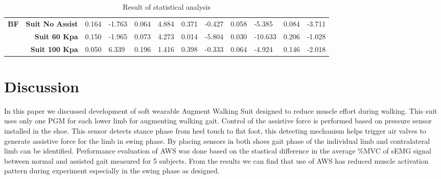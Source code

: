 \documentclass[letterpaper, 10 pt, conference]{ieeeconf}  %
\begin{document}
\begin{table*}[]
\begin{tabular}{@{}lrllllllllll@{}}
		\textbf{BF}                          & \textbf{Suit No Assist}                 & 0.164                                & -1.763                               & 0.064                                & 4.884                                & 0.371                                & -0.427                               & 0.058                                & -5.385                               & 0.084                                & -3.711                               \\
		\textbf{}                            & \textbf{Suit 60 Kpa}                    & 0.150                                & -1.965                               & 0.073                                & 4.273                                & 0.014                                & -5.804                               & 0.030                                & -10.633                              & 0.206                                & -1.028                               \\
		\textbf{}                            & \textbf{Suit 100 Kpa}                   & 0.050                                & 6.339                                & 0.196                                & 1.416                                & 0.398                                & -0.333                               & 0.064                                & -4.924                               & 0.146                                & -2.018                               \\ \bottomrule
	\end{tabular}
	\caption{Result of statistical analysis}
	\label{ptvalues}
\end{table*}

\section{Discussion} \label{discuss}

In this paper we discussed development of soft wearable Augment Walking Suit designed to reduce muscle effort during walking. This suit uses only one PGM for each lower limb for augmenting walking gait. Control of the assistive force is performed based on pressure sensor installed in the shoe. This sensor detects stance phase from heel touch to flat foot, this detecting mechanism helps trigger air valves to generate assistive force for the limb in swing phase. By placing sensors in both shoes gait phase of the individual limb and contralateral limb can be identified. Performance evaluation of AWS was done based on the stastical difference in the average \%MVC of sEMG signal between normal and assisted gait measured for 5 subjects. From the results we can find that use of AWS has reduced muscle activation pattern during experiment especially in the swing phase as designed. 
\end{document}
